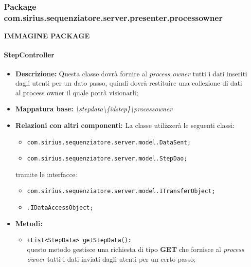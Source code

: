 \subsubsection{Package com.sirius.sequenziatore.server.presenter.processowner}
\textbf{IMMAGINE PACKAGE}
\paragraph{StepController}%
\begin{itemize}
	\item \textbf{Descrizione: } Questa classe dovrà fornire al \textit{process owner} tutti i dati inseriti dagli utenti per un dato passo, quindi dovrà restituire una collezione di dati al process owner il quale potrà visionarli;
	\item \textbf{Mappatura base: } \textit{\textbackslash stepdata\textbackslash \{idstep\}\textbackslash processowner}
	\item \textbf{Relazioni con altri componenti: }
	La classe utilizzerà le seguenti classi:
	\begin{itemize}
		\item \texttt{com.sirius.sequenziatore.server.model.DataSent;}
		\item \texttt{com.sirius.sequenziatore.server.model.StepDao;}
	\end{itemize}
	tramite le interfacce:
	\begin{itemize}
		\item \texttt{com.sirius.sequenziatore.server.model.ITransferObject;}
		\item \texttt{\sModel .IDataAccessObject;}
	\end{itemize}
	\item \textbf{Metodi: }\begin{itemize}
					\item \texttt{+List<StepData> getStepData():}\\
					questo metodo gestisce una richiesta di tipo \textbf{GET} che fornisce al \textit{process owner} tutti i dati inviati dagli utenti per un certo passo;
				\end{itemize}
\end{itemize}
